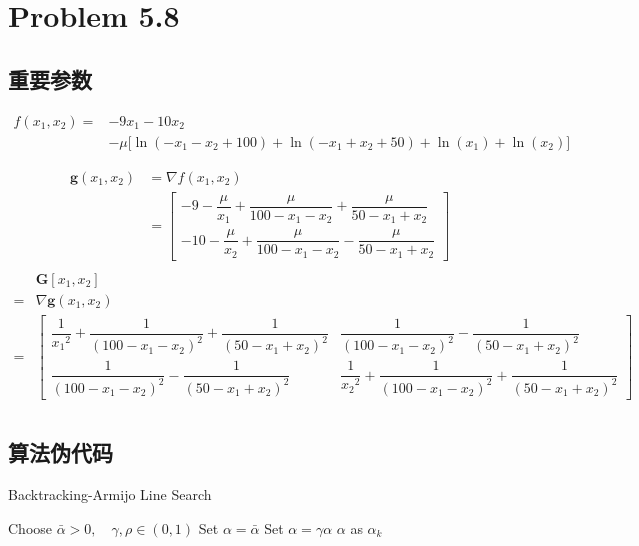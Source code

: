 \newpage
\section{Problem 5.8}
\subsection{重要参数}
\begin{align}
f({x_1},{x_2})=&-9{x_1}-10{x_2}\nonumber\\
&-\mu \big[\ln(-{x_1}-{x_2}+100)+\ln (-{x_1}+{x_2}+50)+\ln ({x_1})+\ln ({x_2})\big]
\nonumber
\end{align}


\begin{align}
\bm{g}(x_1, x_2) &= \nabla f(x_1, x_2)\nonumber\\
&=
\begin{bmatrix}
-9 -\dfrac{\mu}{x_1 }+\dfrac{\mu}{100 - x_1 - x_2} + \dfrac{\mu}{50 - x_1 + x_2} \nonumber\\
-10 - \dfrac{\mu}{x_2 }+\dfrac{\mu}{100 - x_1 - x_2} - \dfrac{\mu}{50 - x_1 + x_2}
\end{bmatrix}\nonumber\\\nonumber
\end{align}
\begin{align}
&\bm{G}[x_1, x_2] \nonumber\\
=& \nabla \bm{g}(x_1, x_2)\nonumber \\
=&
\begin{bmatrix}
\dfrac{1}{{x_1}^2 }+\dfrac{1}{(100 - x_1 - x_2)^2} + \dfrac{1}{(50 - x_1 + x_2)^2} 
&\dfrac{1}{(100 - x_1 - x_2)^2} - \dfrac{1}{(50 - x_1 + x_2)^2}\\
\dfrac{1}{(100 - x_1 - x_2)^2} - \dfrac{1}{(50 - x_1 + x_2)^2}&
\dfrac{1}{{x_2}^2 }+\dfrac{1}{(100 - x_1 - x_2)^2} + \dfrac{1}{(50 - x_1 + x_2)^2} 
\end{bmatrix}\nonumber\\ \nonumber
\end{align}

\subsection{算法伪代码}
\begin{algorithm}[h]  
\caption{Backtracking-Armijo Line Search} 
\label{Amj} 
\begin{algorithmic}[1]  
\STATE Choose $\bar{\alpha}>0,\quad \gamma,\rho\in (0,1)$
\STATE Set $\alpha=\bar{\alpha}$
\STATE Set $\alpha=\gamma\alpha$
\ENDWHILE
\RETURN $\alpha$ as $\alpha_k$
\end{algorithmic}  
\end{algorithm}


